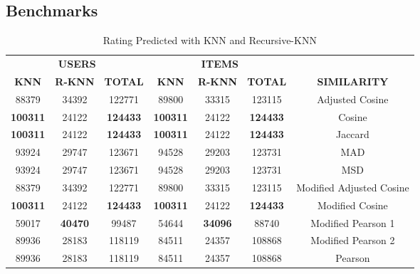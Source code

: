 \subsection{Benchmarks}
\begin{table}[H]
\centering
\caption{Rating Predicted with KNN and Recursive-KNN}
\label{table:prediction_counters_by_sim}
\begin{tabular}{ccc|ccc|c}
\multicolumn{3}{c|}{\textbf{USERS}}            & \multicolumn{3}{c|}{\textbf{ITEMS}}            &                          \\ \cline{1-6}
\textbf{KNN} & \textbf{R-KNN} & \textbf{TOTAL} & \textbf{KNN} & \textbf{R-KNN} & \textbf{TOTAL} & \textbf{SIMILARITY}      \\ \hline
88379        & 34392          & 122771         & 89800        & 33315          & 123115         & Adjusted Cosine          \\
\textbf{100311}       & 24122          & \textbf{124433}         & \textbf{100311}       & 24122          & \textbf{124433}         & Cosine                   \\
\textbf{100311}       & 24122          & \textbf{124433}         & \textbf{100311}       & 24122          & \textbf{124433}         & Jaccard                  \\
93924        & 29747          & 123671         & 94528        & 29203          & 123731         & MAD                      \\
93924        & 29747          & 123671         & 94528        & 29203          & 123731         & MSD                      \\
88379        & 34392          & 122771         & 89800        & 33315          & 123115         & Modified Adjusted Cosine \\
\textbf{100311}       & 24122          & \textbf{124433}         & \textbf{100311}       & 24122          & \textbf{124433}         & Modified Cosine          \\
59017        & \textbf{40470}          & 99487          & 54644        & \textbf{34096}          & 88740          & Modified Pearson 1       \\
89936        & 28183          & 118119         & 84511        & 24357          & 108868         & Modified Pearson 2       \\
89936        & 28183          & 118119         & 84511        & 24357          & 108868         & Pearson
\end{tabular}
\end{table}

